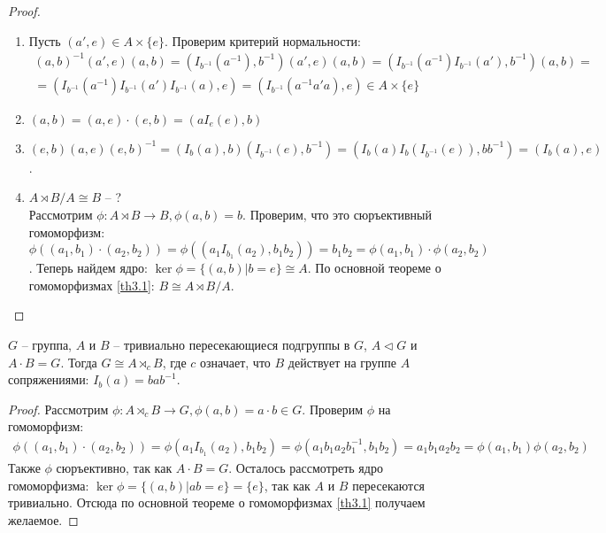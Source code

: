 \begin{proof}
    \begin{enumerate}
        \item Пусть $(a', e) \in A \times \{ e \}$. Проверим критерий нормальности: 
        \begin{equation}
        \begin{gathered}
        (a, b)^{-1}(a', e)(a, b) = (I_{b^{-1}}(a^{-1}), b^{-1})(a', e)(a, b) = (I_{b^{-1}}(a^{-1}) I_{b^{-1}}(a'), b^{-1})(a, b) = \\
        = (I_{b^{-1}}(a^{-1})I_{b^{-1}}(a')I_{b^{-1}}(a), e) = (I_{b^{-1}}(a^{-1} a' a), e) \in A \times \{ e \}
        \end{gathered}
        \end{equation}
        \item $(a, b) = (a, e) \cdot (e, b) = (a I_e(e), b)$
        \item $(e, b)(a, e)(e, b)^{-1} = (I_b(a), b)(I_{b^{-1}}(e), b^{-1}) = (I_b(a)I_b(I_{b^{-1}}(e)), bb^{-1}) = (I_b(a), e)$.
        \item $A \rtimes B/A \cong B$ -- ? \\
        Рассмотрим $\phi: A \rtimes B \to B, \phi(a, b) = b$. Проверим, что это сюръективный гомоморфизм: $\phi((a_1, b_1) \cdot (a_2, b_2)) = \phi ((a_1I_{b_1}(a_2), b_1b_2)) = b_1b_2 = \phi(a_1, b_1) \cdot \phi(a_2, b_2)$. Теперь найдем ядро: $\ker \phi = \{ (a, b)|b = e \} \cong A$. По основной теореме о гомоморфизмах \ref{th3.1}: $B \cong A \rtimes B/A$.
    \end{enumerate}
\end{proof}

\begin{theorem}
    $G$ -- группа, $A$ и $B$ -- тривиально пересекающиеся подгруппы в $G$, $A \lhd G$ и $A \cdot B = G$. Тогда $G \cong A \rtimes_c B$, где $c$ означает, что $B$ действует на группе $A$ сопряжениями: $I_b(a) = bab^{-1}$.
\end{theorem}

\begin{proof}
    Рассмотрим $\phi: A \rtimes_c B \to G, \phi(a, b) = a \cdot b \in G$. Проверим $\phi$ на гомоморфизм:
    \begin{equation}
        \begin{gathered}
            \phi((a_1, b_1) \cdot (a_2, b_2)) = \phi (a_1 I_{b_1}(a_2), b_1b_2) = \phi(a_1b_1a_2b_1^{-1}, b_1b_2) = a_1b_1a_2b_2 = \phi(a_1, b_1) \phi(a_2, b_2)
        \end{gathered}
    \end{equation}
    Также $\phi$ сюръективно, так как $A \cdot B = G$. Осталось рассмотреть ядро гомоморфизма: $\ker \phi = \{ (a, b)|ab = e \} = \{ e \}$, так как $A$ и $B$ пересекаются тривиально. Отсюда по основной теореме о гомоморфизмах \ref{th3.1} получаем желаемое.
\end{proof}